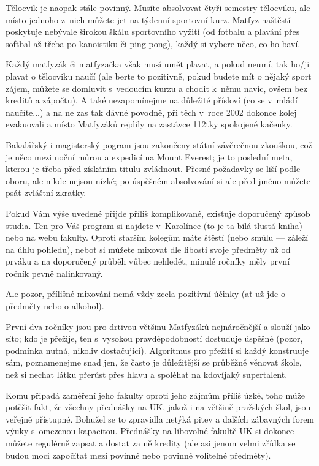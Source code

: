 Tělocvik je naopak stále povinný. Musíte absolvovat čtyři semestry
tělocviku, ale místo jednoho z~nich můžete jet na týdenní
sportovní kurz. Matfyz naštěstí poskytuje nebývale širokou škálu
sportovního vyžití (od fotbalu a plavání přes softbal až třeba po
kanoistiku či ping-pong), každý si vybere něco, co ho baví. 

Každý matfyzák či matfyzačka však musí umět plavat, a pokud neumí, tak
ho/ji plavat o tělocviku naučí (ale berte to pozitivně, pokud
budete mít o nějaký sport zájem, můžete se domluvit s~vedoucím
kurzu a chodit k~němu navíc, ovšem bez kreditů a zápočtu). A také
nezapomínejme na důležité přísloví (co se v~mládí naučíte...)
a na ne zas tak dávné povodně, při těch v~roce 2002 dokonce kolej
evakuovali a místo Matfyzáků rejdily na zastávce 112tky
spokojené kačenky.

Bakalářský i magisterský pogram jsou zakončeny státní závěrečnou zkouškou, což je něco mezi noční můrou a expedicí na Mount Everest; je to poslední meta, kterou je třeba před získáním titulu zvládnout. Přesné požadavky se liší podle oboru, ale nikde nejsou nízké; po úspěšném absolvování si ale před jméno můžete psát zvláštní zkratky.


Pokud Vám výše uvedené přijde příliš komplikované, existuje doporučený způsob studia. Ten pro Váš program si najdete v~Karolínce (to je ta bílá tlustá kniha) nebo na webu fakulty. Oproti starším kolegům máte štěstí (nebo smůlu --- záleží na úhlu pohledu), neboť si můžete mixovat dle libosti svoje předměty už od prváku a na doporučený průběh vůbec nehledět, minulé ročníky měly první ročník pevně nalinkovaný. 

Ale pozor, přílišné mixování nemá vždy zcela pozitivní účinky (ať už jde o předměty nebo o alkohol).

První dva ročníky jsou
pro drtivou většinu Matfyzáků nejnáročnější a slouží jako síto; kdo
je přežije, ten s~vysokou pravděpodobností dostuduje úspěšně
(pozor, podmínka nutná, nikoliv dostačující). Algoritmus pro
přežití si každý konstruuje sám, poznamenejme snad jen, že často
je důležitější se průběžně věnovat škole, než si nechat látku
přerůst přes hlavu a spoléhat na kdovíjaký supertalent.

Komu připadá zaměření jeho fakulty oproti jeho zájmům příliš úzké,
toho může potěšit fakt, že všechny přednášky na UK, jakož i na
většině pražských škol, jsou veřejně přístupné. Bohužel se to
zpravidla netýká pitev a dalších zábavných forem výuky s~omezenou
kapacitou. Přednášky na libovolné fakultě UK si dokonce můžete
regulérně zapsat a dostat za ně kredity (ale asi jenom velmi
zřídka se budou moci započítat mezi povinné nebo povinně volitelné
předměty).

